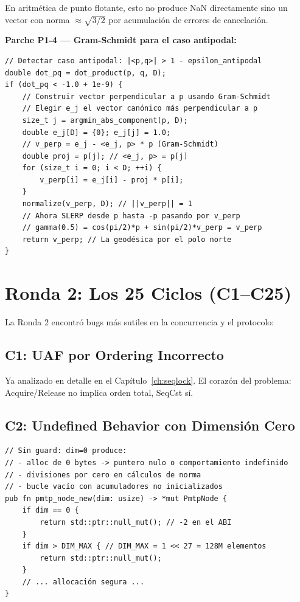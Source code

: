 En aritmética de punto flotante, esto no produce NaN directamente sino un vector
con norma $\approx \sqrt{3/2}$ por acumulación de errores de cancelación.

\textbf{Parche P1-4 --- Gram-Schmidt para el caso antipodal:}
\begin{verbatim}
// Detectar caso antipodal: |<p,q>| > 1 - epsilon_antipodal
double dot_pq = dot_product(p, q, D);
if (dot_pq < -1.0 + 1e-9) {
    // Construir vector perpendicular a p usando Gram-Schmidt
    // Elegir e_j el vector canónico más perpendicular a p
    size_t j = argmin_abs_component(p, D);
    double e_j[D] = {0}; e_j[j] = 1.0;
    // v_perp = e_j - <e_j, p> * p (Gram-Schmidt)
    double proj = p[j]; // <e_j, p> = p[j]
    for (size_t i = 0; i < D; ++i) {
        v_perp[i] = e_j[i] - proj * p[i];
    }
    normalize(v_perp, D); // ||v_perp|| = 1
    // Ahora SLERP desde p hasta -p pasando por v_perp
    // gamma(0.5) = cos(pi/2)*p + sin(pi/2)*v_perp = v_perp
    return v_perp; // La geodésica por el polo norte
}
\end{verbatim}

\section{Ronda 2: Los 25 Ciclos (C1--C25)}

La Ronda 2 encontró bugs más sutiles en la concurrencia y el protocolo:

\subsection{C1: UAF por Ordering Incorrecto}

Ya analizado en detalle en el Capítulo~\ref{ch:seqlock}. El corazón del problema:
Acquire/Release no implica orden total, SeqCst sí.

\subsection{C2: Undefined Behavior con Dimensión Cero}

\begin{verbatim}
// Sin guard: dim=0 produce:
// - alloc de 0 bytes -> puntero nulo o comportamiento indefinido
// - divisiones por cero en cálculos de norma
// - bucle vacío con acumuladores no inicializados
pub fn pmtp_node_new(dim: usize) -> *mut PmtpNode {
    if dim == 0 {
        return std::ptr::null_mut(); // -2 en el ABI
    }
    if dim > DIM_MAX { // DIM_MAX = 1 << 27 = 128M elementos
        return std::ptr::null_mut();
    }
    // ... allocación segura ...
}
\end{verbatim}

